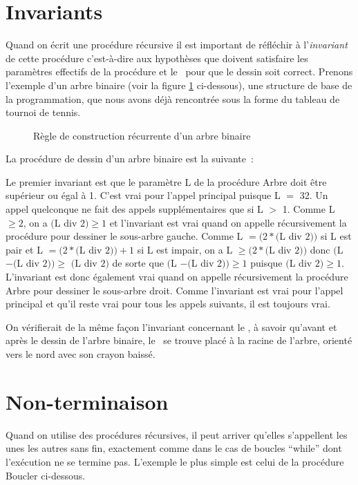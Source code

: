 \section{Invariants}
Quand on écrit une procédure récursive il est important de réfléchir à l'{\em in\-va\-riant\/} 
de cette procédure c'est-à-dire aux hypothèses que doivent satisfaire les paramètres
effectifs de la procédure et le \robot\ pour que le dessin soit correct. Prenons l'exemple d'un
arbre binaire (voir la figure \ref{fig:arbin} ci-dessous), une structure de base de la
programmation, que nous avons déjà rencontrée sous la forme du tableau de tournoi de tennis. 
\begin{figure}[htbp]
 \caption{Règle de construction récurrente d'un arbre binaire}\label{fig:arbin}
\end{figure}

\noindent La procédure de dessin d'un arbre binaire est la suivante~:



Le premier invariant est que le paramètre {\idt L} de la procédure {\idt Arbre} doit être 
supérieur ou égal à 1. C'est
vrai pour l'appel principal puisque {\idt L} $=$ 32. Un appel quelconque
ne fait des appels supplémentaires que si {\idt L} $>$ 1. Comme 
{\idt L} $\geq 2$, on a
$(${\idt L} {\mcl div} $2) \geq 1$ et l'invariant est vrai quand on appelle récursivement la 
procédure pour dessiner le sous-arbre gauche. Comme 
{\idt L} $= (2 \ast (${\idt L} {\mcl div} $2))$ 
si {\idt L} est pair et 
{\idt L} $= (2 \ast (${\idt L} {\mcl div} $2)) + 1$
si {\idt L} est impair, on a
{\idt L} $\geq (2 \ast (${\idt L} {\mcl div} $2))$ donc 
$(${\idt L} $- (${\idt L} {\mcl div} $2)) \geq$ $(${\idt L} {\mcl div} $2)$ de sorte que
$(${\idt L} $- (${\idt L} {\mcl div} $2)) \geq 1$
puisque $(${\idt L} {\mcl div} $2) \geq 1$. L'invariant est donc également vrai quand on appelle 
récursivement la 
procédure {\idt Arbre} pour dessiner le sous-arbre droit. Comme l'invariant est vrai pour l'appel principal
et qu'il reste vrai pour tous les appels suivants, il est toujours vrai.

On vérifierait de la même façon l'invariant concernant le \robot, à savoir qu'avant et après
le dessin de l'arbre binaire, le \robot\ se trouve placé à la racine de l'arbre, orienté vers le nord avec son
crayon baissé.

\section{Non-terminaison}
Quand on utilise des procédures récursives, il peut arriver qu'elles s'appellent les unes les autres
sans fin, exactement comme dans le cas de boucles ``while'' dont l'exécution ne se termine pas. L'exemple le
plus simple est celui de la procédure {\idt Boucler} ci-dessous.

